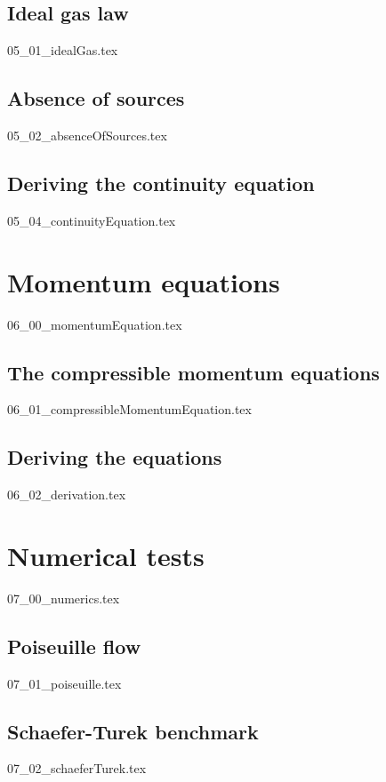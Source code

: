 \documentclass[12pt,a4paper,twoside]{article}
\begin{document}
\subsection{Ideal gas law}
\label{sub: Ideal gas law}
{05_01_idealGas.tex}

\subsection{Absence of sources}
\label{sub: Absence of sources}
{05_02_absenceOfSources.tex}

\subsection{Deriving the continuity equation}
\label{sub: Deriving the continuity equation}
{05_04_continuityEquation.tex}

\newpage
\section{Momentum equations}
\label{sec: Momentum equations}
{06_00_momentumEquation.tex}

\subsection{The compressible momentum equations}
\label{sub: The compressible momentum equations}
{06_01_compressibleMomentumEquation.tex}

\subsection{Deriving the equations}
\label{sub: Deriving the equations}
{06_02_derivation.tex}

\newpage
\section{Numerical tests}
\label{sec: Numerics}
{07_00_numerics.tex}

\subsection{Poiseuille flow}
\label{sub: Poiseuille flow}
{07_01_poiseuille.tex}

\subsection{Schaefer-Turek benchmark}
\label{sub: Schaefer-Turek benchmark}
{07_02_schaeferTurek.tex}
\end{document}
